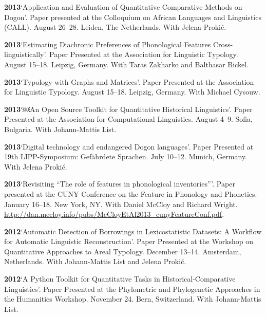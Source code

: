 \documentclass[11pt]{article}
\newcommand{\hangpara}{
 \setlength{\parindent}{0in} %
 \hangindent=0.42in %
}
\begin{document}
\vskip 6pt
\hangpara
{\bf 2013}\hspace{1ex}`Application and Evaluation of Quantitative Comparative Methods on Dogon'. Paper presented at the Colloquium on African Languages and Linguistics (CALL). August 26--28. Leiden, The Netherlands. With Jelena Proki{\'c}.

\vskip 6pt
\hangpara
{\bf 2013}\hspace{1ex}`Estimating Diachronic Preferences of Phonological Features Cross-linguistically'. Paper Presented at the Association for Linguistic Typology. August 15--18. Leipzig, Germany. With Taras Zakharko and Balthasar Bickel.

\vskip 6pt
\hangpara
{\bf 2013}\hspace{1ex}`Typology with Graphs and Matrices'. Paper Presented at the Association for Linguistic Typology. August 15--18. Leipzig, Germany. With Michael Cysouw.

\vskip 6pt
\hangpara
{\bf 2013}\hspace{1ex}`￼An Open Source Toolkit for Quantitative Historical Linguistics'. Paper Presented at the Association for Computational Linguistics. August 4--9. Sofia, Bulgaria. With Johann-Mattis List.

\vskip 6pt
\hangpara
{\bf 2013}\hspace{1ex}`Digital technology and endangered Dogon languages'. Paper Presented at 19th LIPP-Symposium: Gef{\"a}hrdete Sprachen. July 10--12. Munich, Germany. With Jelena Proki{\'c}.

\vskip 6pt
\hangpara
{\bf 2013}\hspace{1ex}`Revisiting ``The role of features in phonological inventories'''. Paper presented at the CUNY Conference on the Feature in Phonology and Phonetics. January 16--18. New York, NY. With Daniel McCloy and Richard Wright. \url{http://dan.mccloy.info/pubs/McCloyEtAl2013_cunyFeatureConf.pdf}.

\vskip 6pt
\hangpara
{\bf 2012}\hspace{1ex}`Automatic Detection of Borrowings in Lexicostatistic Datasets: A Workflow for Automatic Linguistic Reconstruction'. Paper Presented at the Workshop on Quantitative Approaches to Areal Typology. December 13--14. Amsterdam, Netherlands. With Johann-Mattis List and Jelena Proki{\'c}.

\vskip 6pt
\hangpara
{\bf 2012}\hspace{1ex}`A Python Toolkit for Quantitative Tasks in Historical-Comparative Linguistics'. Paper Presented at the Phylometric and Phylogenetic Approaches in the Humanities Workshop. November 24. Bern, Switzerland. With Johann-Mattis List.
\end{document}
